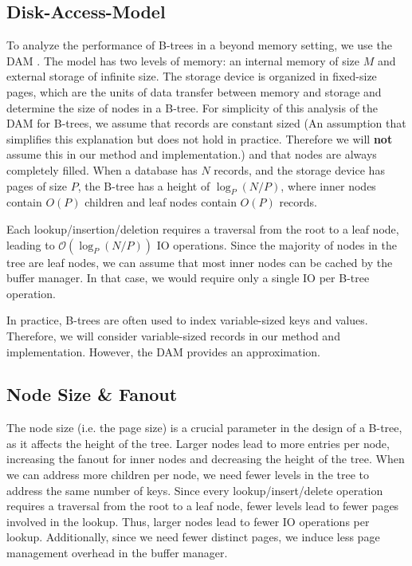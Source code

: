 \subsection*{Disk-Access-Model}
To analyze the performance of B-trees in a beyond memory setting, we use the \ac{DAM} \cite{aggarwal1988complexity} \cite{kuszmaul2014fractal}.
The model has two levels of memory: an internal memory of size $M$ and external storage of infinite size.
The storage device is organized in fixed-size pages, which are the units of data transfer between memory and storage and determine the size of nodes in a B-tree.
For simplicity of this analysis of the \ac{DAM} for B-trees, we assume that records are constant sized (An assumption that simplifies this explanation but does not hold in practice. 
Therefore we will \textbf{not} assume this in our method and implementation.) and that nodes are always completely filled.
When a database has $N$ records, and the storage device has pages of size $P$, the B-tree has a height of $\log_P(N/P)$, where inner nodes contain $O(P)$ children and leaf nodes contain $O(P)$ records.

Each lookup/insertion/deletion requires a traversal from the root to a leaf node, leading to $\mathcal{O}(\log_P(N/P))$ \ac{IO} operations.
Since the majority of nodes in the tree are leaf nodes, we can assume that most inner nodes can be cached by the buffer manager.
In that case, we would require only a single \ac{IO} per B-tree operation.

In practice, B-trees are often used to index variable-sized keys and values.
Therefore, we will consider variable-sized records in our method and implementation.
However, the \ac{DAM} provides an approximation.


\subsection*{Node Size \& Fanout}
\label{sec:node-size-fanout}
The node size (i.e. the page size) is a crucial parameter in the design of a B-tree, as it affects the height of the tree.
Larger nodes lead to more entries per node, increasing the fanout for inner nodes and decreasing the height of the tree.
When we can address more children per node, we need fewer levels in the tree to address the same number of keys.
Since every lookup/insert/delete operation requires a traversal from the root to a leaf node, fewer levels lead to fewer pages involved in the lookup.
Thus, larger nodes lead to fewer \ac{IO} operations per lookup.
Additionally, since we need fewer distinct pages, we induce less page management overhead in the buffer manager.

